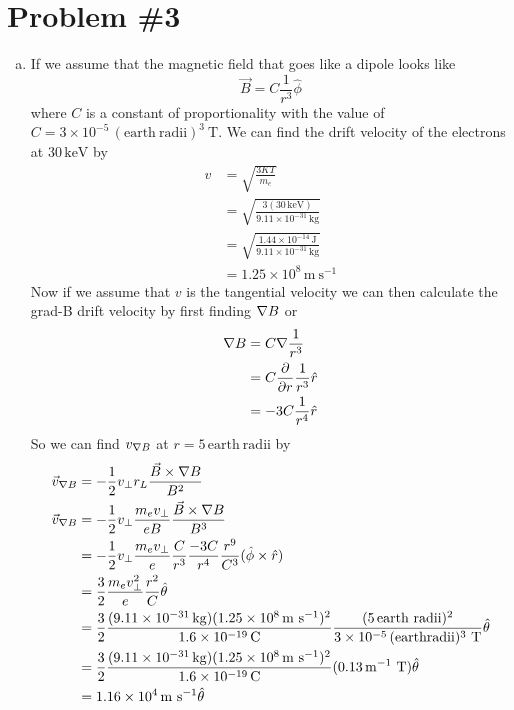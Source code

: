 \documentclass[11pt]{article}
\numberwithin{equation}{section}
\newcommand{\grad}{\bold\nabla}
\newcommand{\unit}[1]{\ensuremath{\, \mathrm{#1}}}
\begin{document}
\section{Problem \#3}
\begin{enumerate}[(a)]
\item
If we assume that the magnetic field that goes like a dipole looks like
$$\vec{B} = C\frac{1}{r^3}\hat{\phi}$$
where $C$ is a constant of proportionality with the value of $C = 3\times10^{-5}\unit{(earth\ radii)^3\ T}$. We can find the drift velocity of the electrons at $30\unit{keV}$ by
\begin{align*}
v &= \sqrt{\frac{3KT}{m_e}}\\
&= \sqrt{\frac{3(30\unit{keV})}{9.11\times10^{-31}\unit{kg}}}\\
&= \sqrt{\frac{1.44\times10^{-14}\unit{J}}{9.11\times10^{-31}\unit{kg}}}\\
&= 1.25\times10^{8}\unit{m\ s^{-1}}
\end{align*}
Now if we assume that $v$ is the tangential velocity we can then calculate the grad-B drift velocity by first finding $\grad B$ or
\begin{align*}
\grad B &= C\grad\frac{1}{r^3}\\
&= C\frac{\partial}{\partial r}\frac{1}{r^3}\hat{r}\\
&= -3C\frac{1}{r^4}\hat{r}\\
\end{align*}
So we can find $v_{\grad B}$ at $r=5\unit{earth\ radii}$ by
\begin{align*}
\vec{v}_{\grad B} &= -\frac{1}{2}v_{\perp}r_L \frac{\vec{B}\times\grad B}{B^2}\\
\vec{v}_{\grad B} &= -\frac{1}{2}v_{\perp}\frac{m_ev_{\perp}}{eB}\frac{\vec{B}\times\grad B}{B^3}\\
&= -\frac{1}{2}v_{\perp}\frac{m_ev_{\perp}}{e}\frac{C}{r^3}\frac{-3C}{r^4}\frac{r^9}{C^3}(\hat{\phi}\times\hat{r})\\
&= \frac{3}{2}\frac{m_ev_{\perp}^2}{e}\frac{r^2}{C}\hat{\theta}\\
&= \frac{3}{2}\frac{(9.11\times10^{-31}\unit{kg})(1.25\times10^{8}\unit{m\ s^{-1}})^2}{1.6\times10^{-19}\unit{C}}\frac{(5\unit{earth\ radii})^2}{3\times10^{-5}\unit{(earth radii)^3\ T}}\hat{\theta}\\
&= \frac{3}{2}\frac{(9.11\times10^{-31}\unit{kg})(1.25\times10^{8}\unit{m\ s^{-1}})^2}{1.6\times10^{-19}\unit{C}}(0.13\unit{m^{-1}\ T})\hat{\theta}\\
&= 1.16\times10^{4}\unit{m\ s^{-1}}\hat{\theta}

\end{align*}
\end{enumerate}
\end{document}
